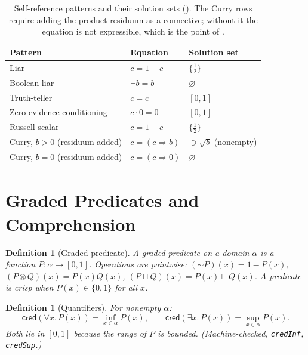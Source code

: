 \documentclass[11pt,a4paper]{article}
\newtheorem{definition}[theorem]{Definition}
\newcommand{\cred}{\mathsf{cred}}
\newcommand{\negc}{\mathord{\sim}}
\newcommand{\conjc}{\otimes}
\newcommand{\disjc}{\sqcup}
\begin{document}
\begin{table}[ht]
\centering
\begin{tabular}{lll}
\toprule
Pattern & Equation & Solution set \\
\midrule
Liar & $c = 1 - c$ & $\{\tfrac12\}$ \\
Boolean liar & $\lnot b = b$ & $\varnothing$ \\
Truth-teller & $c = c$ & $[0,1]$ \\
Zero-evidence conditioning & $c \cdot 0 = 0$ & $[0,1]$ \\
Russell scalar & $c = 1 - c$ & $\{\tfrac12\}$ \\
Curry, $b > 0$ (residuum added) & $c = (c \Rightarrow b)$
  & $\ni \sqrt b$ (nonempty) \\
Curry, $b = 0$ (residuum added) & $c = (c \Rightarrow 0)$
  & $\varnothing$ \\
\bottomrule
\end{tabular}
\caption{Self-reference patterns and their solution sets
().
The Curry rows require adding the product residuum as a connective;
without it the equation is not expressible, which is the point of
.}
\label{tab:solution-sets}
\end{table}

\section{Graded Predicates and Comprehension}
\label{sec:comprehension}

\begin{definition}[Graded predicate]
\label{def:graded-pred}
A \emph{graded predicate} on a domain $\alpha$ is a function
$P : \alpha \to [0,1]$.
Operations are pointwise:
$(\negc P)(x) = 1 - P(x)$,
$(P \conjc Q)(x) = P(x) Q(x)$,
$(P \disjc Q)(x) = P(x) \disjc Q(x)$.
A predicate is \emph{crisp} when $P(x) \in \{0,1\}$ for all $x$.
\end{definition}

\begin{definition}[Quantifiers]
\label{def:quantifiers}
For nonempty $\alpha$:
\[
  \cred(\forall x.\, P(x)) = \inf_{x \in \alpha} P(x), \qquad
  \cred(\exists x.\, P(x)) = \sup_{x \in \alpha} P(x).
\]
Both lie in $[0,1]$ because the range of $P$ is bounded.
(Machine-checked, \texttt{credInf}, \texttt{credSup}.)
\end{definition}
\end{document}
